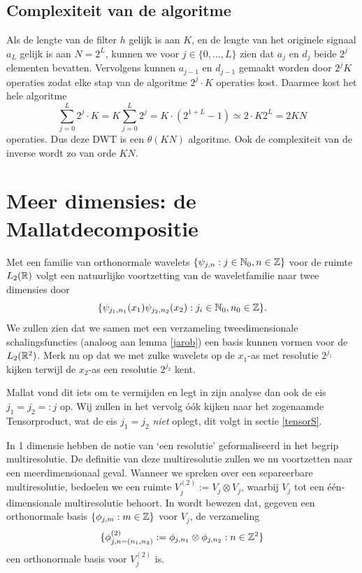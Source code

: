 \subsection{Complexiteit van de algoritme}
Als de lengte van de filter $h$ gelijk is aan $K$, en de lengte van het originele signaal $a_L$ 
gelijk is aan $N = 2^{L}$,
 kunnen we voor $j \in \{0, \ldots, L\}$ zien dat $a_j$ en $d_j$ beide $2^{j}$ elementen bevatten. 
Vervolgens kunnen $a_{j-1}$ en $d_{j-1}$ gemaakt worden door $2^{j}K$ operaties zodat elke stap van de algoritme 
$2^{j} \cdot K$ operaties kost. 
Daarmee kost het hele algoritme
\[
\sum_{j=0}^L 2^{j} \cdot K = K \sum_{j=0}^L 2^{j} = K \cdot (2^{1+L} - 1) \simeq 2 \cdot K 2^{L} = 2KN
\]
operaties. Dus deze DWT is een $\theta(KN)$ algoritme. 
Ook de complexiteit van de inverse wordt zo van orde $KN$.

\section{Meer dimensies: de Mallatdecompositie}
Met een familie van orthonormale wavelets $\{ \psi_{j,n}: j \in \mathbb{N}_0, n \in \mathbb{Z}\}$ voor de ruimte $L_2(\mathbb{R})$ volgt een natuurlijke voortzetting
van de waveletfamilie naar twee dimensies door
\[
\{ \psi_{j_1,n_1}(x_1) \psi_{j_2,n_2}(x_2): j_i \in \mathbb{N}_0, n_0 \in \mathbb{Z} \}.
\]
We zullen zien dat we samen met een verzameling tweedimensionale schalingsfuncties (analoog aan lemma \ref{jarob}) een basis kunnen vormen voor de $L_2(\mathbb{R}^2)$.
Merk nu op dat we met zulke wavelets op de $x_1$-as met resolutie $2^{j_1}$ kijken 
terwijl de $x_2$-as een resolutie $2^{j_2}$ kent.

Mallat vond dit iets om te vermijden \cite[\S 7.7]{mallat} en legt in zijn analyse dan ook de eis $j_1 = j_2 =: j$ op. 
Wij zullen in het vervolg \'o\'ok kijken naar het zogenaamde Tensorproduct, wat de eis $j_1 = j_2$ \emph{niet} oplegt,
dit volgt in sectie \ref{tensorS}.

In 1 dimensie hebben de notie van `een resolutie' geformaliseerd in het begrip multiresolutie.
De definitie van deze multiresolutie zullen we nu voortzetten naar een meerdimensionaal geval. 
Wanneer we spreken over een separeerbare multiresolutie, bedoelen we een ruimte $V_j^{(2)} := V_j \otimes V_j$,
waarbij $V_j$ tot een \'e\'en-dimensionale multiresolutie behoort.
In \cite[A.5]{mallat} wordt bewezen dat, gegeven een orthonormale basis $\{ \phi_{j,m}: m \in \mathbb{Z} \}$ voor $V_j$, de verzameling
\begin{equation}
  \label{phi_phi_basis}
  \{ \phi^{(2)}_{j,n=(n_1,n_2)} := \phi_{j,n_1} \otimes \phi_{j,n_2}: n \in \mathbb{Z}^2 \}
\end{equation}
een orthonormale basis voor $V_j^{(2)}$ is.

